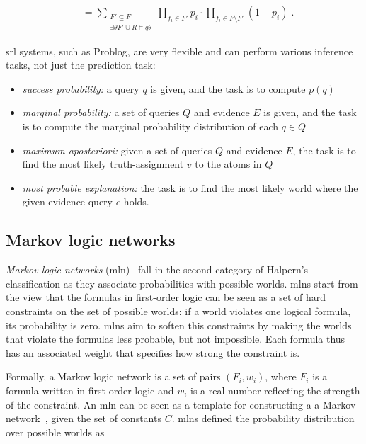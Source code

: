 $$
\begin{aligned}
&= \sum \limits _{\begin{array}{c} F'\subseteq F \\ \exists \theta F'\cup R\models q\theta \end{array}} \prod _{f_i\in F'}p_i\cdot \prod _{f_i\in F\setminus F'}(1-p_i)\;.
\end{aligned}
$$


\gls{srl} systems, such as Problog, are very flexible and can perform various inference tasks, not just the prediction task:
\begin{itemize}
	\item \textit{success probability:} a query $q$ is given, and the task is to compute $p(q)$
	\item \textit{marginal probability:} a set of queries $Q$ and evidence $E$ is given, and the task is to compute the marginal probability distribution of each $q \in Q$
	\item \textit{maximum aposteriori:} given a set of queries $Q$ and evidence $E$, the task is to find the most likely truth-assignment $v$ to the atoms in $Q$
	\item \textit{most probable explanation:} the task is to find the most likely world where the given evidence query $e$ holds.
\end{itemize}



\subsection{Markov logic networks}

\textit{Markov logic networks} (\gls{mln})~\cite{Richardson2006} fall in the second category of Halpern's classification as they associate probabilities with possible worlds.
\gls{mln}s start from the view that the formulas in first-order logic can be seen as a set of hard constraints on the set of possible worlds: if a world violates one logical formula, its probability is zero.
\gls{mln}s aim to soften this constraints by making the worlds that violate the formulas less probable, but not impossible.
Each formula thus has an associated weight that specifies how strong the constraint is.


Formally, a Markov logic network is a set of pairs $(F_i,w_i)$, where $F_i$ is a formula written in first-order logic and $w_i$ is a real number reflecting the strength of the constraint.
An \gls{mln} can be seen as a template for constructing a a Markov network~\cite{koller2009probabilistic}, given the set of constants $C$.
\gls{mln}s defined the probability distribution over possible worlds as

